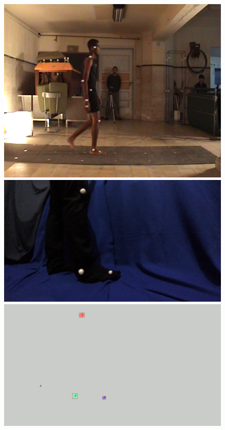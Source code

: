 \begin{figure}[ht!]
      \centering
        {\includegraphics[scale=0.10]{imagenes/abel_original_video.png}\label{abelvideo}}\hspace{1 mm}
        {\includegraphics[scale=0.08]{imagenes/orig.png}\label{abelvideo2}}\hspace{1 mm}
        {\includegraphics[scale=0.08]{imagenes/detect.png}
}
\end{figure}
